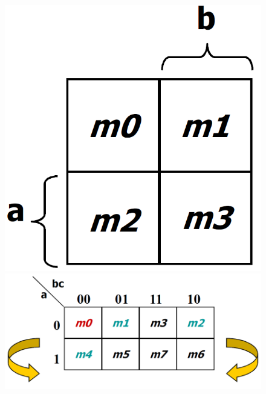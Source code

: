 \documentclass[12pt]{article}
\theoremstyle{definition}
\begin{document}
\begin{figure}[h]
\begin{minipage}{0.12\textwidth}\includegraphics[width = \textwidth]{4_12.png}\end{minipage}\hfill
\begin{minipage}{0.35\textwidth}\includegraphics[width = \textwidth]{4_13.png}\end{minipage}\hfill

\end{figure}
\end{document}
